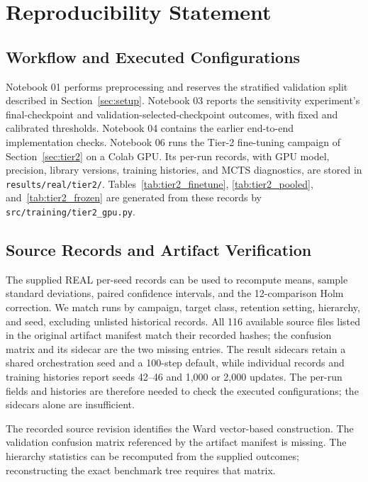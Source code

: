 \documentclass[11pt]{article}
\begin{document}
\clearpage



\clearpage
\appendix
\section{Reproducibility Statement}
\label{app:reproducibility}

\subsection{Workflow and Executed Configurations}
Notebook 01 performs preprocessing and reserves the stratified validation split described in Section~\ref{sec:setup}. Notebook 03 reports the sensitivity experiment's final-checkpoint and validation-selected-checkpoint outcomes, with fixed and calibrated thresholds. Notebook 04 contains the earlier end-to-end implementation checks. Notebook 06 runs the Tier-2 fine-tuning campaign of Section~\ref{sec:tier2} on a Colab GPU. Its per-run records, with GPU model, precision, library versions, training histories, and MCTS diagnostics, are stored in \texttt{results/real/tier2/}. Tables~\ref{tab:tier2_finetune}, \ref{tab:tier2_pooled}, and~\ref{tab:tier2_frozen} are generated from these records by \texttt{src/training/tier2\_gpu.py}.

\subsection{Source Records and Artifact Verification}
The supplied REAL per-seed records can be used to recompute means, sample standard deviations, paired confidence intervals, and the 12-comparison Holm correction. We match runs by campaign, target class, retention setting, hierarchy, and seed, excluding unlisted historical records. All 116 available source files listed in the original artifact manifest match their recorded hashes; the confusion matrix and its sidecar are the two missing entries. The result sidecars retain a shared orchestration seed and a 100-step default, while individual records and training histories report seeds 42--46 and 1,000 or 2,000 updates. The per-run fields and histories are therefore needed to check the executed configurations; the sidecars alone are insufficient.

The recorded source revision identifies the Ward vector-based construction. The validation confusion matrix referenced by the artifact manifest is missing. The hierarchy statistics can be recomputed from the supplied outcomes; reconstructing the exact benchmark tree requires that matrix.
\end{document}
